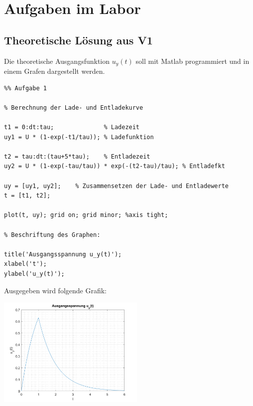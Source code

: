 \chapter{Aufgaben im Labor}
\thispagestyle{fancy}

\section{Theoretische Lösung aus V1}

Die theoretische Ausgangsfunktion $u_y(t)$ soll mit Matlab programmiert und in einem Grafen dargestellt werden. 

\vspace{0.5cm}

\begin{lstlisting}
%% Aufgabe 1

% Berechnung der Lade- und Entladekurve

t1 = 0:dt:tau;              % Ladezeit
uy1 = U * (1-exp(-t1/tau)); % Ladefunktion

t2 = tau:dt:(tau+5*tau);    % Entladezeit
uy2 = U * (1-exp(-tau/tau)) * exp(-(t2-tau)/tau); % Entladefkt

uy = [uy1, uy2];    % Zusammensetzen der Lade- und Entladewerte
t = [t1, t2];

plot(t, uy); grid on; grid minor; %axis tight; 

% Beschriftung des Graphen:

title('Ausgangsspannung u_y(t)');
xlabel('t');
ylabel('u_y(t)');

\end{lstlisting}

\vspace{0.5cm}
    
Ausgegeben wird folgende Grafik:
\begin{center}
\includegraphics[width=200pt]{img/aufgabe1.png}
\end{center}

